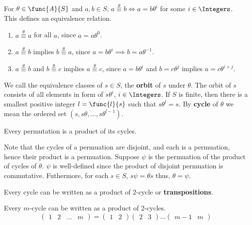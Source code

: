 For \(\theta \in \func{A}{S}\) and \(a,b \in S\), \(a \overset{\theta}{\equiv} b \iff a = b \theta^i\) for some \(i \in \Integers\). This defines an equivalence relation. 

\begin{enumerate}
    \item \(a \overset{\theta}{\equiv} a \) for all \(a\), since \(a = a \theta^0\).
    \item \(a \overset{\theta}{\equiv} b\) implies \(b \overset{\theta}{\equiv} a\), since \(a = b \theta^{i} \implies b = a\theta^{-1}\).
    \item \(a \overset{\theta}{\equiv} b\) and \(b \overset{\theta}{\equiv} c\) implies \(a \overset{\theta}{\equiv} c\), since \(a = b \theta^i\) and \(b = c \theta^j\) implies \(a = c \theta^{i + j}\).
\end{enumerate}

We call the equivalence classes of \(s \in S\), the \textbf{orbit} of \(s\) under \(\theta\). The orbit of \(s\) consists of all elements in form of \(s \theta^i\), \(i \in \Integers\). If \(S\) is finite, then there is a smallest positive integer \(l = \func{l}{s}\) such that \(s\theta^l = s\). By \textbf{cycle} of \(\theta\) we mean the ordered set \((s,s\theta, \dots , s\theta^{l-1})\).

\begin{lemma}
    Every permutation is a product of its cycles.
\end{lemma}

\begin{prooflemma}
    Note that the cycles of a permuation are disjoint, and each is a permuation, hence their product is a permuation. Suppose \(\psi\) is the permuation of the product of cycles of \(\theta\). \(\psi\) is well-defined since the product of disjoint permuation is commutative. Futhermore, for each \(s \in S\), \(s\psi = \theta s\) thus, \(\theta = \psi\).
\end{prooflemma}

\begin{lemma}
    Every cycle can be written as a product of 2-cycle or \textbf{transpositions}.
\end{lemma}

\begin{prooflemma}
    Every \(m\)-cycle can be written as a product of 2-cycles. 
    \begin{equation*}
        \begin{pmatrix*}
            1 & 2& \dots & m
        \end{pmatrix*} = \begin{pmatrix*}
            1 & 2
        \end{pmatrix*}
        \begin{pmatrix*}
            2& 3
        \end{pmatrix*} \dots 
        \begin{pmatrix*}
            m-1& m
        \end{pmatrix*}
    \end{equation*}
\end{prooflemma}

